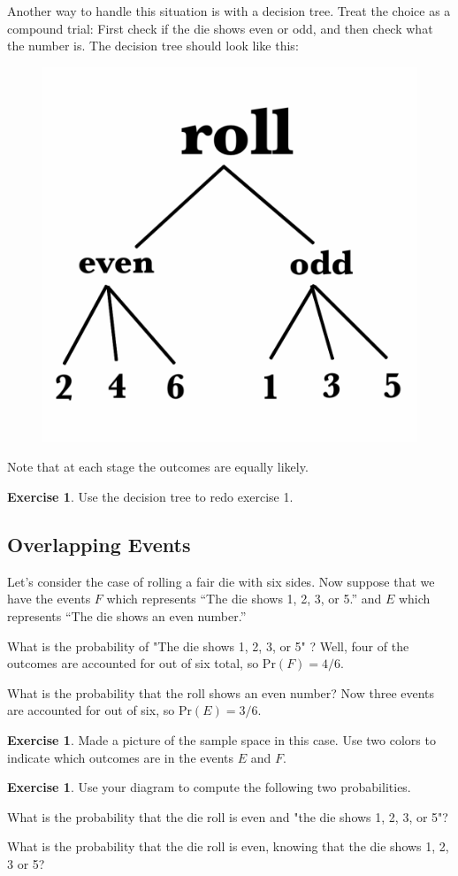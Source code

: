 \documentclass[12pt,letterpaper]{article}
\theoremstyle{definition}
\newtheorem{exercise}[question]{Exercise}
\begin{document}
Another way to handle this situation is with a decision tree. Treat the choice as a compound trial: First check if the die shows even or odd, and then check what the number is.
The decision tree should look like this:

\begin{figure}[h]
\centering
\includegraphics[width=.5\textwidth]{cond-prob.png}
\end{figure}
Note that at each stage the outcomes are equally likely.

\begin{exercise}
Use the decision tree to redo exercise 1.
\end{exercise}

\subsection*{Overlapping Events}
Let's consider the case of rolling a fair die with six sides.
Now suppose that we have the events $F$ which represents ``The die shows 1, 2, 3, or 5.'' and $E$ which represents ``The die shows an even number.''

What is the probability of "The die shows 1, 2, 3, or 5" ? Well, four of the outcomes are accounted for out of six total, so $\mathrm{Pr}(F) = 4/6$.

What is the probability that the roll shows an even number? Now three events are accounted for out of six, so $\mathrm{Pr}(E)=3/6$.


\begin{exercise}
Made a picture of the sample space in this case. Use two colors to indicate which outcomes are in the events $E$ and $F$.
\end{exercise}

\begin{exercise}
Use your diagram to compute the following two probabilities.
\begin{compactitem}
\item What is the probability that the die roll is even and "the die shows 1, 2, 3, or 5"?
\item What is the probability that the die roll is even, knowing that the die shows 1, 2, 3 or 5?
\end{compactitem}
\end{exercise}
\end{document}
